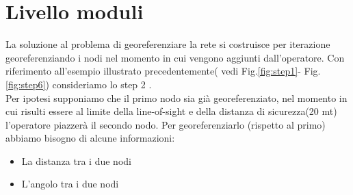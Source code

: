 \section{Livello moduli}
La soluzione al problema di georeferenziare la rete si costruisce per iterazione georeferenziando i nodi nel momento in cui vengono aggiunti dall'operatore. Con riferimento all'esempio illustrato precedentemente( vedi Fig.\ref{fig:step1}- Fig.\ref{fig:step6}) consideriamo lo step 2 .\\
Per ipotesi supponiamo che il primo nodo sia già georeferenziato, nel momento in cui risulti essere al limite della line-of-sight e della distanza di sicurezza(20 mt) l'operatore piazzerà il secondo nodo. Per georeferenziarlo (rispetto al primo) abbiamo bisogno di alcune informazioni:
\begin{itemize}
	\item La distanza tra i due nodi
	\item L'angolo tra i due nodi
\end{itemize}

